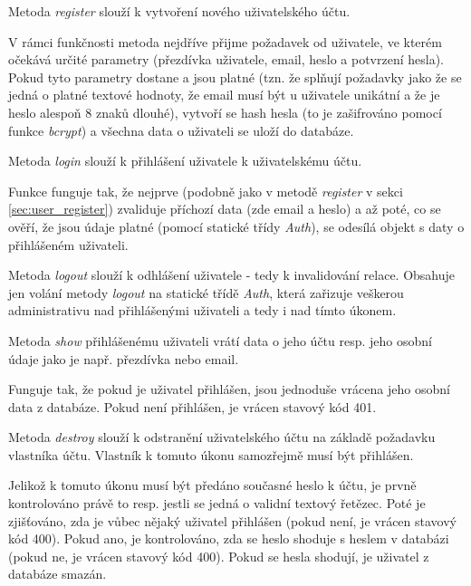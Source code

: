 			\label{sec:user_register}
			Metoda \textit{register} slouží k vytvoření nového uživatelského účtu.
			
			V rámci funkčnosti metoda nejdříve přijme požadavek od uživatele, ve kterém očekává určité parametry (přezdívka uživatele, email, heslo a potvrzení hesla). Pokud tyto parametry dostane a jsou platné (tzn. že splňují požadavky jako že se jedná o platné textové hodnoty, že email musí být u uživatele unikátní a že je heslo alespoň 8 znaků dlouhé), vytvoří se hash hesla (to je zašifrováno pomocí funkce \textit{bcrypt}) a všechna data o uživateli se uloží do databáze. 
			
			\label{sec:user_login}
			Metoda \textit{login} slouží k přihlášení uživatele k uživatelskému účtu. 
			
			Funkce funguje tak, že nejprve (podobně jako v metodě \textit{register} v sekci \ref{sec:user_register}) zvaliduje příchozí data (zde email a heslo) a až poté, co se ověří, že jsou údaje platné (pomocí statické třídy \textit{Auth}), se odesílá objekt s daty o přihlášeném uživateli.
			
			\label{sec:user_logout}
			Metoda \textit{logout} slouží k odhlášení uživatele - tedy k invalidování relace. Obsahuje jen volání metody \textit{logout} na statické třídě \textit{Auth}, která zařizuje veškerou administrativu nad přihlášenými uživateli a tedy i nad tímto úkonem.
			
			\label{sec:user_show}
			Metoda \textit{show} přihlášenému uživateli vrátí data o jeho účtu resp. jeho osobní údaje jako je např. přezdívka nebo email.
			
			Funguje tak, že pokud je uživatel přihlášen, jsou jednoduše vrácena jeho osobní data z databáze. Pokud není přihlášen, je vrácen stavový kód 401.
			
			\label{sec:user_destroy}
			Metoda \textit{destroy} slouží k odstranění uživatelského účtu na základě požadavku vlastníka účtu. Vlastník k tomuto úkonu samozřejmě musí být přihlášen.
			
			Jelikož k tomuto úkonu musí být předáno současné heslo k účtu, je prvně kontrolováno právě to resp. jestli se jedná o validní textový řetězec. Poté je zjišťováno, zda je vůbec nějaký uživatel přihlášen (pokud není, je vrácen stavový kód 400). Pokud ano, je kontrolováno, zda se heslo shoduje s heslem v databázi (pokud ne, je vrácen stavový kód 400). Pokud se hesla shodují, je uživatel z databáze smazán.
			
